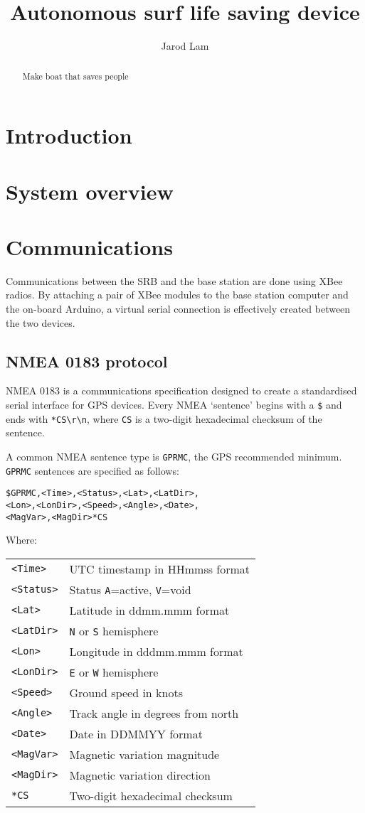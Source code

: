 \documentclass[a4paper]{IEEEtran}
\title{Autonomous surf life saving device}
\author{Jarod Lam}
\newenvironment{nmeaspec}[1]
{
\newcommand{\field}[2]{\texttt{##1} & ##2 \\}
\vspace{0.2cm}
\noindent\texttt{#1}
\vspace{0.2cm}

\noindent Where: \vspace{0.1cm}\\  \noindent
\vspace{0.2cm}
\begin{tabular}{ll}
}
{
\end{tabular}
}
\begin{document}
\maketitle

\begin{abstract}
Make boat that saves people
\end{abstract}

\section{Introduction}


\section{System overview}


\section{Communications}
Communications between the SRB and the base station are done using XBee radios. By attaching a pair of XBee modules to the base station computer and the on-board Arduino, a virtual serial connection is effectively created between the two devices.

\subsection{NMEA 0183 protocol}
NMEA 0183 is a communications specification designed to create a standardised serial interface for GPS devices. Every NMEA `sentence' begins with a \texttt{\$} and ends with \texttt{*CS\textbackslash r\textbackslash n}, where \texttt{CS} is a two-digit hexadecimal checksum of the sentence.

A common NMEA sentence type is \texttt{GPRMC}, the GPS recommended minimum. \texttt{GPRMC} sentences are specified as follows: \cite{gpsinfo}

\begin{nmeaspec}{\$GPRMC,<Time>,<Status>,<Lat>,<LatDir>,\\<Lon>,<LonDir>,<Speed>,<Angle>,<Date>,\\<MagVar>,<MagDir>*CS}
\field{<Time>}{UTC timestamp in HHmmss format}
\field{<Status>}{Status \texttt{A}=active, \texttt{V}=void}
\field{<Lat>}{Latitude in ddmm.mmm format}
\field{<LatDir>}{\texttt{N} or \texttt{S} hemisphere}
\field{<Lon>}{Longitude in dddmm.mmm format}
\field{<LonDir>}{\texttt{E} or \texttt{W} hemisphere}
\field{<Speed>}{Ground speed in knots}
\field{<Angle>}{Track angle in degrees from north}
\field{<Date>}{Date in DDMMYY format}
\field{<MagVar>}{Magnetic variation magnitude}
\field{<MagDir>}{Magnetic variation direction}
\field{*CS}{Two-digit hexadecimal checksum}
\end{nmeaspec}
\end{document}
